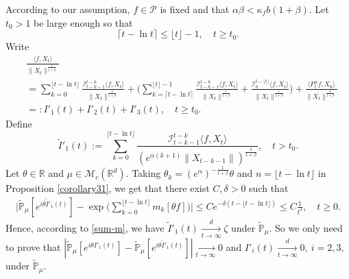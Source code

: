 \documentclass[12pt,a4paper]{amsart}
\theoremstyle{plain}
\theoremstyle{definition}
\numberwithin{equation}{section}
\begin{document}
According to our assumption, $f\in \mathcal P$  is fixed  and  that $\alpha \beta < \kappa_f b(1+\beta)$.
	Let $t_0 > 1$ be large enough so that
\[
	\lceil t - \ln t\rceil
	\leq \lfloor t \rfloor - 1,
	\quad t\geq t_0.
\]
	Write
\begin{align*}
	&\frac{\langle f,X_t\rangle}{\|X_t\|^{\frac{1}{1+\beta}}}
	\\&=\sum_{k=0}^{\lfloor t-\ln t \rfloor} \frac{\mathcal I_{t-k-1}^{t-k}\langle f ,X_t\rangle}{\|X_t\|^{\frac{1}{1+\beta}}}+ \Big(\sum_{k=\lceil t-\ln t \rceil}^{\lfloor t \rfloor-1} \frac{\mathcal I_{t-k-1}^{t-k}\langle f ,X_t\rangle}{\|X_t\|^{\frac{1}{1+\beta}}}+\frac{\mathcal I_0^{t-\lfloor t \rfloor}\langle f ,X_t\rangle}{\|X_t\|^{\frac{1}{1+\beta}}}\Big) +
\frac{\langle P^\alpha_t f, X_0\rangle}{\|X_t\|^{\frac{1}{1+\beta}}}
	\\&=:I'_1(t)+I'_2(t)+I'_3(t),
	\quad t\geq t_0.
\end{align*}
	Define
 \[
 	\tilde I'_1(t)
 	:=\sum_{k=0}^{\lfloor t-\ln t \rfloor}\frac{\mathcal I_{t-k-1}^{t-k}\langle f ,X_t\rangle}{( e^{\alpha(k+1)}\|X_{t-k-1}\|)^{\frac{1}{1+\beta}}},
 	\quad t > t_0.
 \]
    Let $\theta\in \mathbb R$ and $\mu\in \mathcal M_c(\mathbb R^d)$.
    Taking $\theta_k=(e^{\alpha})^{-\frac{1}{1+\beta}} \theta $ and $n={\lfloor t-\ln t \rfloor}$ in Proposition \ref{corollary31},
    we get that there exist $C,\delta > 0$ such that
\begin{align*}
    \Big|\mathbb{\tilde{P}}_{\mu} [e^{i\theta\tilde I'_1(t)} ]-\exp\Big(\sum_{k=0}^{\lfloor t-\ln t \rfloor}m_k[\theta f]\Big)\Big|
    \leq C e^{-\delta(t - \lfloor t - \ln t\rfloor)}
    \leq C \frac{1}{t^{\delta}},
    \quad t\geq 0.
\end{align*}
Hence, according to \eqref{sum-m}, we have $\tilde I'_1(t)\xrightarrow[t\to \infty]{d} \zeta$ under $\tilde {\mathbb P}_\mu$.
   So we only need to prove that $|\mathbb{\tilde{P}}_{\mu}[e^{i\theta I'_1(t)}]-\mathbb{\tilde{P}}_{\mu}[e^{i\theta\tilde I'_1(t)}]|\xrightarrow[t\to \infty]{} 0$ and $I'_i(t)\xrightarrow[t\to \infty]{d} 0,~i=2,3,$ under $\tilde {\mathbb P}_\mu$.
\end{document}
